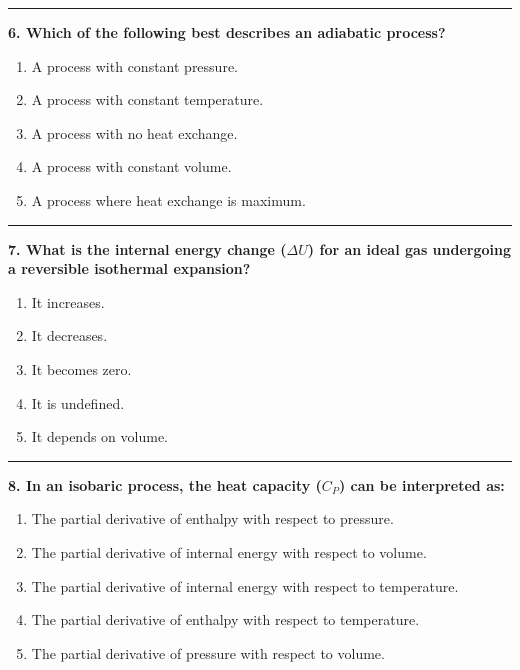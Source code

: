 \documentclass[
  9pt,
]{extbook}
\providecommand{\tightlist}{%
  \setlength{\itemsep}{0pt}\setlength{\parskip}{0pt}}
\theoremstyle{definition}
\theoremstyle{definition}
\theoremstyle{definition}
\theoremstyle{definition}
\theoremstyle{remark}
\begin{document}
\begin{center}\rule{0.5\linewidth}{0.5pt}\end{center}

\textbf{6. Which of the following best describes an adiabatic process?}

\begin{enumerate}
\def\labelenumi{\alph{enumi}.}
\tightlist
\item
  A process with constant pressure.
\item
  A process with constant temperature.
\item
  A process with no heat exchange.
\item
  A process with constant volume.
\item
  A process where heat exchange is maximum.
\end{enumerate}

\begin{center}\rule{0.5\linewidth}{0.5pt}\end{center}

\textbf{7. What is the internal energy change (\(\Delta U\)) for an ideal gas undergoing a reversible isothermal expansion?}

\begin{enumerate}
\def\labelenumi{\alph{enumi}.}
\tightlist
\item
  It increases.
\item
  It decreases.
\item
  It becomes zero.
\item
  It is undefined.
\item
  It depends on volume.
\end{enumerate}

\begin{center}\rule{0.5\linewidth}{0.5pt}\end{center}

\textbf{8. In an isobaric process, the heat capacity (\(C_P\)) can be interpreted as:}

\begin{enumerate}
\def\labelenumi{\alph{enumi}.}
\tightlist
\item
  The partial derivative of enthalpy with respect to pressure.
\item
  The partial derivative of internal energy with respect to volume.
\item
  The partial derivative of internal energy with respect to temperature.
\item
  The partial derivative of enthalpy with respect to temperature.
\item
  The partial derivative of pressure with respect to volume.
\end{enumerate}
\end{document}
